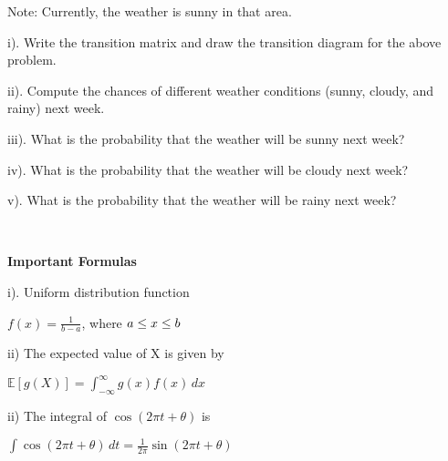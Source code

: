 \documentclass[6pt]{article}
\begin{document}
Note: Currently, the weather is sunny in that area.

i). Write the transition matrix and draw the transition diagram for the above problem.

ii). Compute the chances of different weather conditions (sunny,  cloudy, and rainy) next week.

iii). What is the probability that the weather will be sunny next week?

iv). What is the probability that the weather will be cloudy next week?

v). What is the probability that the weather will be rainy next week?

\vspace{1200pt}

\newpage
\thispagestyle{empty}
~
\newpage

\textbf{Important Formulas}

i). Uniform distribution function

$f(x) = \frac{1}{b - a}$,    where  $a \leq x \leq b \\$



ii) The expected value of X is given by

$\mathbb{E}[g(X)] = \int_{-\infty}^{\infty} g(x) f(x) \, dx$

ii) The integral of $\cos(2\pi t + \theta) $ is

$\int \cos(2\pi t + \theta) \, dt = \frac{1}{2\pi} \sin(2\pi t + \theta) $
\end{document}
